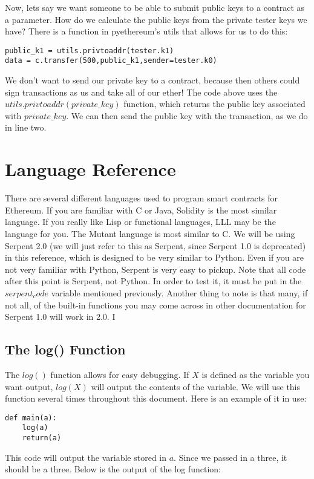 \documentclass[12pt]{article}
\begin{document}
Now, lets say we want someone to be able to submit public keys to a contract as a parameter. How do we calculate the public keys from the private tester keys we have? There is a function in pyethereum's utils that allows for us to do this:

\begin{verbatim}
public_k1 = utils.privtoaddr(tester.k1)
data = c.transfer(500,public_k1,sender=tester.k0)
\end{verbatim}

We don't want to send our private key to a contract, because then others could sign transactions as us and take all of our ether! The code above uses the $utils.privtoaddr(private\_key)$ function, which returns the public key associated with $private\_key$. We can then send the public key with the transaction, as we do in line two.




\section{Language Reference}

There are several different languages used to program smart contracts for Ethereum. If you are familiar with C or Java, Solidity is the most similar language. If you really like Lisp or functional languages, LLL may be the language for you. The Mutant language is most similar to C. We will be using Serpent 2.0 (we will just refer to this as Serpent, since Serpent 1.0 is deprecated) in this reference, which is designed to be very similar to Python. Even if you are not very familiar with Python, Serpent is very easy to pickup. Note that all code after this point is Serpent, not Python. In order to test it, it must be put in the $serpent_code$ variable mentioned previously. Another thing to note is that many, if not all, of the built-in functions you may come across in other documentation for Serpent 1.0 will work in 2.0.
I
\subsection{The log() Function}

The $log()$ function allows for easy debugging. If $X$ is defined as the variable you want output, $log(X)$ will output the contents of the variable. We will use this function several times throughout this document. Here is an example of it in use:

\begin{verbatim}
def main(a):
	log(a)
	return(a)
\end{verbatim}
This code will output the variable stored in $a$. Since we passed in a three, it should be a three. Below is the output of the log function:
\end{document}
